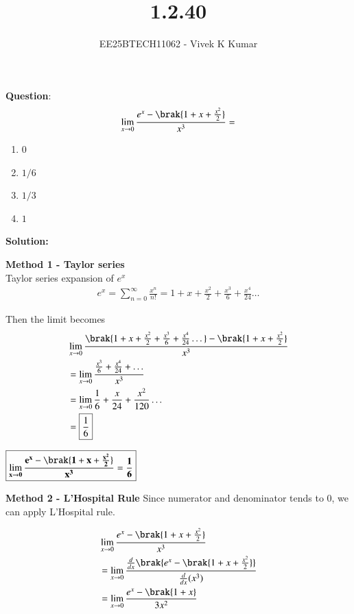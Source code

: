 \documentclass[journal]{IEEEtran}
\title{1.2.40}
\author{EE25BTECH11062 - Vivek K Kumar}
\begin{document}
\maketitle

\renewcommand{\thefigure}{\theenumi}
\renewcommand{\thetable}{\theenumi}


\textbf{Question}:\\
\begin{align}
    \lim\limits_{x\to0} \frac{e^x-\brak{1+x+\frac{x^2}{2}}}{x^3} = 
\end{align}
\begin{enumerate}
    \item $0$
    \item $1/6$
    \item $1/3$
    \item $1$
\end{enumerate}
\textbf{Solution: }

\textbf{Method 1 - Taylor series}\\
Taylor series expansion of $e^x$
\begin{align}
    e^x = \sum\limits_{n=0}^\infty \frac{x^n}{n!} = 1+x+\frac{x^2}{2}+\frac{x^3}{6}+\frac{x^4}{24} \dots
\end{align}

Then the limit becomes
\begin{align}
    &\lim\limits_{x\to0}\frac{\brak{1+x+\frac{x^2}{2}+\frac{x^3}{6}+\frac{x^4}{24} \dots} - \brak{1+x+\frac{x^2}{2}}}{x^3} \\
    &= \lim\limits_{x\to0} \frac{\frac{x^3}{6} + \frac{x^4}{24} + \dots}{x^3} \\
    &= \lim\limits_{x\to0} \frac{1}{6} + \frac{x}{24} + \frac{x^2}{120}\dots \\
   & = \boxed{\frac{1}{6}}
\end{align}
\begin{center}
$\boxed{\mathbf{ \lim\limits_{x\to0} \frac{e^x-\brak{1+x+\frac{x^2}{2}}}{x^3} = \frac{1}{6}}}$
\end{center}

\textbf{Method 2 - L'Hospital Rule}
Since numerator and denominator tends to 0, we can apply L'Hospital rule. 

\begin{align}
    &\lim\limits_{x\to0} \frac{e^x-\brak{1+x+\frac{x^2}{2}}}{x^3} \\
    &= \lim\limits_{x\to0}\frac{\frac{d}{dx}\brak{e^x - \brak{1+x+\frac{x^2}{2}}}}{\frac{d}{dx}(x^3)} \\
    &= \lim\limits_{x\to0} \frac{e^x - \brak{1+x}}{3x^2}    
\end{align}
\end{document}
